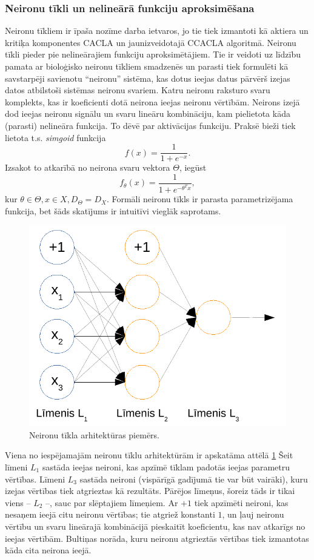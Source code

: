 \documentclass{ludis} %
\begin{document}
\subsubsection{Neironu tīkli un nelineārā funkciju aproksimēšana}
Neironu tīkliem ir īpaša nozīme darba ietvaros, jo tie tiek izmantoti kā aktiera
un kritiķa komponentes CACLA un jaunizveidotajā CCACLA algoritmā.
Neironu tīkli pieder pie nelineārajiem funkciju aproksimētājiem. Tie ir veidoti
uz līdzību pamata ar bioloģisko neironu tīkliem smadzenēs un parasti tiek
formulēti kā savstarpēji savienotu ``neironu'' sistēma, kas dotus ieejas datus
pārvērš izejas datos atbilstoši sistēmas neironu svariem. Katru neironu raksturo
svaru komplekts, kas ir koeficienti dotā neirona ieejas neironu vērtībām.
Neirons izejā dod ieejas neironu signālu un svaru lineāru kombināciju, kam
pielietota kāda (parasti) nelineāra funkcija. To dēvē par aktivācijas funkciju.
Praksē bieži tiek lietota t.s. \textit{simgoid} funkcija
\[
	f(x) = \frac{1}{1 + e^{-x}}.
\]
Izsakot to atkarībā no neirona svaru vektora $\Theta$, iegūst
\[
	f_\theta(x) = \frac{1}{1 + e^{-\theta^T x}},
\]
kur $\theta \in \Theta, x \in X, D_\Theta = D_X$. Formāli neironu tīkls ir
parasta parametrizējama funkcija, bet šāds skatījums ir intuitīvi vieglāk
saprotams.

\begin{figure}
	\centering
	\includegraphics{Img/nn-arhitektura.pdf}
	\caption{Neironu tīkla arhitektūras piemērs.}
	\label{fig:nn}
\end{figure}

Viena no iespējamajām neironu tīklu arhitektūrām ir apskatāma attēlā
\ref{fig:nn} Šeit līmeni $L_1$ sastāda ieejas neironi, kas apzīmē tīklam padotās
ieejas parametru vērtības. Līmeni $L_3$ sastāda neironi (vispārīgā gadījumā tie
var būt vairāki), kuru izejas vērtības tiek atgrieztas kā rezultāts. Pārējos
līmeņus, šoreiz tāds ir tikai viens -- $L_2$ --, sauc par slēptajiem līmeņiem.
Ar $+1$ tiek apzīmēti neironi, kas nesaņem ieejā citu neironu vērtības; tie
atgriež konstanti $1$, un ļauj neironu vērtību un svaru lineārajā kombinācijā
pieskaitīt koeficientu, kas nav atkarīgs no ieejas vērtībām. Bultiņas norāda,
kuru neironu atgrieztās vērtības tiek izmantotas kāda cita neirona ieejā.
\end{document}
